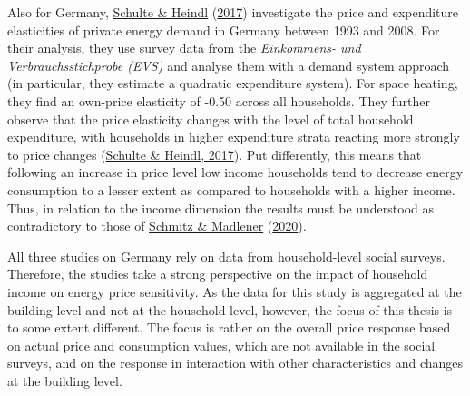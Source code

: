 \documentclass[12pt,twoside]{reedthesis}
\begin{document}
Also for Germany, \protect\hyperlink{ref-schulte_heindl17}{Schulte \& Heindl} (\protect\hyperlink{ref-schulte_heindl17}{2017}) investigate the price and expenditure elasticities of private energy demand in Germany between 1993 and 2008. For their analysis, they use survey data from the \emph{Einkommens- und Verbrauchsstichprobe (EVS)} and analyse them with a demand system approach (in particular, they estimate a quadratic expenditure system). For space heating, they find an own-price elasticity of -0.50 across all households. They further observe that the price elasticity changes with the level of total household expenditure, with households in higher expenditure strata reacting more strongly to price changes (\protect\hyperlink{ref-schulte_heindl17}{Schulte \& Heindl, 2017}). Put differently, this means that following an increase in price level low income households tend to decrease energy consumption to a lesser extent as compared to households with a higher income. Thus, in relation to the income dimension the results must be understood as contradictory to those of \protect\hyperlink{ref-schmitz_madlener20}{Schmitz \& Madlener} (\protect\hyperlink{ref-schmitz_madlener20}{2020}).

All three studies on Germany rely on data from household-level social surveys. Therefore, the studies take a strong perspective on the impact of household income on energy price sensitivity. As the data for this study is aggregated at the building-level and not at the household-level, however, the focus of this thesis is to some extent different. The focus is rather on the overall price response based on actual price and consumption values, which are not available in the social surveys, and on the response in interaction with other characteristics and changes at the building level.
\end{document}
